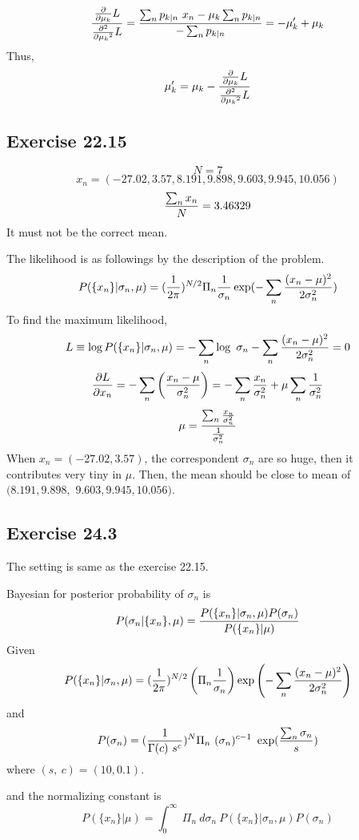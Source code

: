\documentclass[a4paper,11pt]{article}
\numberwithin{equation}{section}
\begin{document}
{$$
{{\partial \over \partial{\mu_k}}L \over {\partial^2 \over \partial{\mu_k}^2}L  } = {\sum_n p_{k|n} ~x_n -  \mu_k\sum_n p_{k|n} \over -\sum_n p_{k|n}}= -\mu'_k+\mu_k
$$
Thus, 
$$
\mu'_k=\mu_k-{{\partial \over \partial{\mu_k}}L \over {\partial^2 \over \partial{\mu_k}^2}L  }
$$

\subsection{Exercise 22.15}
$$
N=7
$$
$$
x_n=(-27.02, 3.57, 8.191, 9.898, 9.603, 9.945, 10.056)
$$
$$
{\sum_n x_n\over N}=3.46329
$$
It must not be the correct mean. 

The likelihood is as followings by the description of the problem. 
$$
P(\{x_n\}|\sigma_n,\mu) = ({1 \over 2\pi })^{N/2} \Pi_n{1\over \sigma_n } \exp(-\sum_n {(x_n-\mu)^2 \over 2\sigma^2_n})
$$ 
To find the maximum likelihood,
$$
L \equiv \log P(\{x_n\}|\sigma_n,\mu) = -\sum_n \log~\sigma_n-\sum_n {(x_n -\mu)^2 \over 2\sigma_n^2} =0 
$$
$$
{\partial L \over \partial x_n} = -\sum_n \left({x_n-\mu \over \sigma^2_n}\right)=-\sum_n{x_n \over \sigma_n^2}+\mu\sum_n {1 \over \sigma_n^2}
$$
$$
\mu= {\sum_n{x_n\over \sigma_n^2}\over{1\over \sigma_n^2}}
$$
When $x_n=(-27.02, 3.57)$, the correspondent $\sigma_n$ are so huge, then it contributes very tiny in $\mu$. Then, the mean should be close to mean of $(8.191, 9.898,$ 
$9.603, 9.945, 10.056)$.


\subsection{Exercise 24.3}

The setting is same as the exercise 22.15.

Bayesian for posterior probability of $\sigma_n$ is 
$$
P(\sigma_n|\{x_n\},\mu)= {P(\{x_n\}|\sigma_n,\mu) P(\sigma_n)\over P(\{x_n\}|\mu)}
$$
Given
$$
P(\{x_n\}|\sigma_n,\mu) = ({1 \over 2\pi })^{N/2} \left( \Pi_n{1\over \sigma_n }\right) \exp\left(-\sum_n {(x_n-\mu)^2 \over 2\sigma^2_n}\right)
$$ 
and
$$
P(\sigma_n)=({1\over \Gamma(c)~s^c})^N\Pi_n~(\sigma_n)^{c-1}~\exp({\sum_n \sigma_n \over s})$$
where $(s,~c)=(10,0.1)$.

and the normalizing constant is
$$
P(\{x_n\}|\mu)=\int^{\infty}_0~\Pi_n~d\sigma_n ~P(\{x_n\}|\sigma_n,\mu) P(\sigma_n)
$$


}
\end{document}
